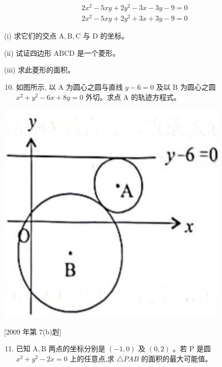 \documentclass[10pt]{article}
\begin{document}
$$
\begin{aligned}
& 2 x^{2}-5 x y+2 y^{2}-3 x-3 y-9=0 \\
& 2 x^{2}-5 x y+2 y^{2}+3 x+3 y-9=0
\end{aligned}
$$

(i) 求它们的交点 $\mathrm{A}, \mathrm{B}, \mathrm{C}$ 与 $\mathrm{D}$ 的坐标。

(ii) 试证四边形 $\mathrm{ABCD}$ 是一个菱形。

(iii) 求此菱形的面积。

\begin{enumerate}
  \setcounter{enumi}{9}
  \item 如图所示, 以 $\mathrm{A}$ 为圆心之圆与直线 $y-6=0$ 及以 $\mathrm{B}$ 为圆心之圆 $x^{2}+y^{2}-6 x+8 y=0$ 外切。求点 $\mathrm{A}$ 的轨迹方程式。
\end{enumerate}

\begin{center}
\includegraphics[max width=\textwidth]{2024_06_07_f484519cd4dc635602b3g-04}
\end{center}

[2009 年第 7(b)㓳]

\begin{enumerate}
  \setcounter{enumi}{10}
  \item 已知 $\mathrm{A}, \mathrm{B}$ 两点的坐标分别是 $(-1,0)$ 及 $(0,2)$ 。若 $\mathrm{P}$ 是圆 $x^{2}+y^{2}-2 x=0$ 上的任意点,求 $\triangle P A B$ 的面积的最大可能值。
\end{enumerate}
\end{document}
